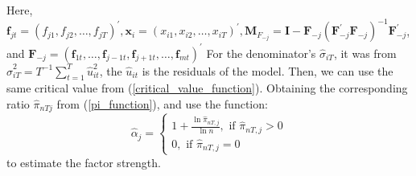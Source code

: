 Here, $\bm{f}_{j t}=\left(f_{j 1}, f_{j 2}, \ldots, f_{j T}\right)^{\prime}, \bm{x}_{i}=\left(x_{i 1}, x_{i 2}, \ldots, x_{i T}\right)^{\prime}, \bm{M}_{F_{-j}}=\bm{I}-\bm{F}_{-j}\left(\bm{F}_{-j}^{\prime} \bm{F}_{-j}\right)^{-1} \bm{F}_{-j}^{\prime}$, and $\bm{F}_{-j}=\left(\bm{f}_{1 t}, \ldots, \bm{f}_{j-1 t}, \bm{f}_{j+1 t}, \ldots, \bm{f}_{m t}\right)^{\prime}$
For the denominator's $\hat{\sigma}_{iT}$, it was from $\hat{\sigma}_{i T}^{2}=T^{-1} \sum_{t=1}^{T} \hat{u}_{i t}^{2}$, the $\hat{u}_{it}$ is the residuals of the model.
Then, we can use the same critical value from (\ref{critical_value_function}).
Obtaining the corresponding ratio $\hat{\pi}_{nTj}$  from (\ref{pi_function}), and use the function:
\begin{equation*}
\hat{\alpha}_{j}=\left\{\begin{array}{l}
1+\frac{\ln \hat{\pi}_{n T, j}}{\ln n}, \text { if } \hat{\pi}_{n T, j}>0 \\
0, \text { if } \hat{\pi}_{n T, j}=0
\end{array}\right.
\end{equation*}
to estimate the factor strength.
